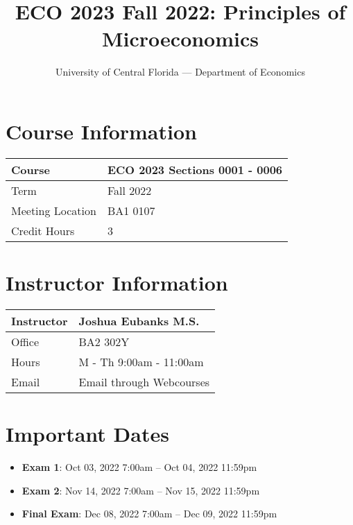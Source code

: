 \documentclass[11pt]{paper}
\begin{document}
\title{ECO 2023 Fall 2022: Principles of Microeconomics}
\author{University of Central Florida --- Department of Economics}

\maketitle
\hrulefill

\section*{Course Information}
\begin{flushleft}
\begin{tabular}{| l | l |}\hline
 Course & ECO 2023 Sections 0001 - 0006 \\\hline
 Term & Fall 2022 \\\hline
 Meeting Location & BA1 0107\\\hline
 Credit Hours & 3 \\\hline
\end{tabular}
\end{flushleft}

\section*{Instructor Information}
\begin{flushleft}
\begin{tabular}{| l | l |}\hline
 Instructor & Joshua Eubanks M.S. \\\hline
 Office & BA2 302Y \\\hline
 Hours & M - Th 9:00am - 11:00am \\\hline
 Email & Email through Webcourses\\\hline
\end{tabular}
\end{flushleft}

\section*{Important Dates}

\begin{itemize}
  \item \textbf{Exam 1}: Oct 03, 2022 7:00am -- Oct 04, 2022 11:59pm
  \item \textbf{Exam 2}: Nov 14, 2022 7:00am -- Nov 15, 2022 11:59pm
  \item \textbf{Final Exam}: Dec 08, 2022 7:00am -- Dec 09, 2022 11:59pm

\end{itemize}
\end{document}

